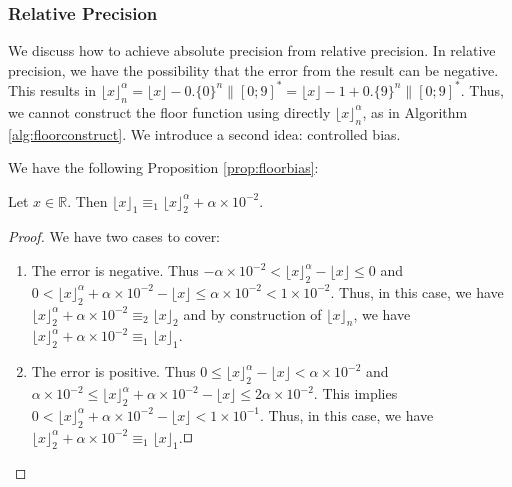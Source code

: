 \documentclass[runningheads]{llncs}
\begin{document}
\subsubsection{Relative Precision}
We discuss how to achieve absolute precision from relative precision. In relative precision, we have the possibility that the error from the result can be negative. This results in $\lfloor x \rfloor_n^\alpha = \lfloor x \rfloor - 0.\{0\}^{n}\|[0;9]^*=\lfloor x \rfloor-1 + 0.\{9\}^{n}\|[0;9]^* $. Thus, we cannot construct the floor function using directly $\lfloor x \rfloor_n^\alpha$, as in Algorithm \ref{alg:floorconstruct}. We introduce a second idea: controlled bias.

\medskip

\noindent We have the following Proposition \ref{prop:floorbias}:
\begin{proposition}\label{prop:floorbias}
  Let $x\in\mathbb{R}$. Then $\lfloor x\rfloor_1 \equiv_1 \lfloor x \rfloor_2^\alpha + \alpha\times10^{-2}$.
\end{proposition}
\begin{proof}
  We have two cases to cover: \begin{enumerate}
    \item The error is negative. Thus $-\alpha\times 10^{-2} < \lfloor x \rfloor_2^\alpha - \lfloor x \rfloor \leq 0$ and $0 < \lfloor x \rfloor_2^\alpha + \alpha\times 10^{-2} - \lfloor x \rfloor \leq \alpha\times 10^{-2} < 1\times 10^{-2}$. Thus, in this case, we have $\lfloor x \rfloor_2^\alpha + \alpha\times 10^{-2} \equiv_2 \lfloor x \rfloor_2$ and by construction of $\lfloor x \rfloor_n$, we have $\lfloor x \rfloor_2^\alpha + \alpha\times 10^{-2} \equiv_1 \lfloor x \rfloor_1$.
    \item The error is positive. Thus $0 \leq \lfloor x \rfloor_2^\alpha - \lfloor x \rfloor < \alpha\times10^{-2}$ and $\alpha\times10^{-2} \leq \lfloor x \rfloor_2^\alpha + \alpha\times 10^{-2} - \lfloor x \rfloor \leq 2\alpha\times 10^{-2}$. This implies $0<\lfloor x \rfloor_2^\alpha + \alpha\times 10^{-2} - \lfloor x \rfloor<1\times10^{-1}$. Thus, in this case, we have $\lfloor x \rfloor_2^\alpha + \alpha\times 10^{-2} \equiv_1 \lfloor x \rfloor_1$.\hfill $\qed$ 
  \end{enumerate}
\end{proof}
\end{document}
